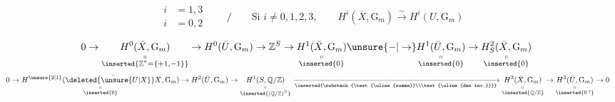 \[
\begin{aligned} i&=1,3\\i&=0,2\end{aligned}
\qquad\big/\qquad \text{Si }i\ne0,1,2,3,\qquad H^i(\bar{X},\mathrm{G}_m)\xrightarrow{\sim}H^i(U,\mathrm{G}_m)
\]

\[
\begin{aligned}
0&\to\underset{\substack{\shortparallel\\\inserted{\mathbb{Z}^*=\{+1,-1\}}}}{H^0(\bar{X},\mathrm{G}_m)}
\to H^0(\bar{U},\mathrm{G}_m)\to\mathbb{Z}^S\to
\underset{\substack{\shortparallel\\\inserted{0}}}{H^1(\bar{X},\mathrm{G}_m)}
\unsure{-|\to}\underset{\substack{\shortparallel\\\inserted{0}}}{H^1(\bar{U},\mathrm{G}_m)}
\to\underset{\substack{\shortparallel\\\inserted{0}}}{H^2_S(\bar{X},\mathrm{G}_m)}
\end{aligned}
\]
\[
\begin{aligned}
0&\to\underset{\substack{\shortparallel\\\inserted{0}}}{H^{\unsure{2|1}}(\bar{\deleted{\unsure{U|X}}X},\mathrm{G}_m)}
\to H^2(\bar{U},\mathrm{G}_m)\to\underset{\substack{\shortparallel\\\inserted{(\mathbb{Q}/\mathbb{Z})^S}}}{H^1(S,\mathbb{Q}/\mathbb{Z})}
\xrightarrow[\inserted{\substack{\text{\uline{somme}}\\\text{\uline{des inv.}}}}]{}
\underset{\substack{\shortparallel\\\inserted{\mathbb{Q}/\mathbb{Z}}}}{H^3(\bar{X},\mathrm{G}_m)}
\to\underset{\substack{\shortparallel\\\inserted{0\,?}}}{H^3(\bar{U},\mathrm{G}_m)}\to0
\end{aligned}
\]


